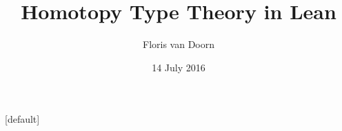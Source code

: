 \documentclass[xcolor=table]{beamer}
\title{Homotopy Type Theory in Lean}
\author{Floris van Doorn}
\institute[CMU]{Department of Philosophy\\
Carnegie Mellon University\nb
\url{leanprover.github.io}}
\date{14 July 2016}
\begin{document}
{[default]
\begin{frame}
  \titlepage
\end{frame}
}








\end{document}
